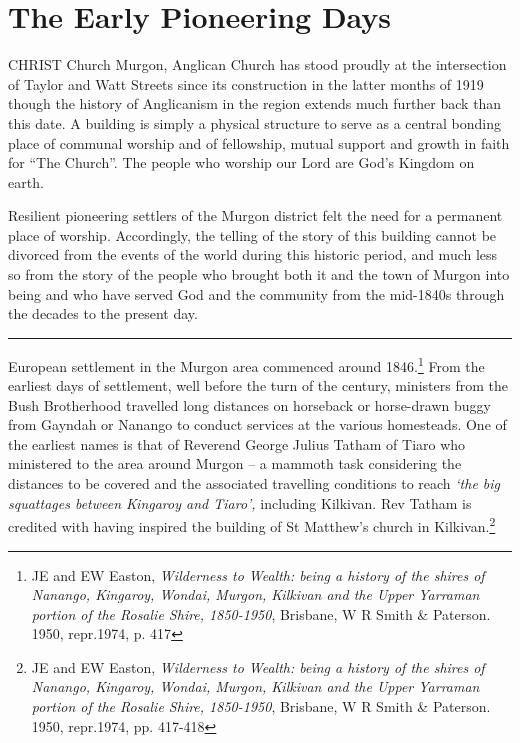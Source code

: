 

\chapter{The Early Pioneering Days}
\nobalance


\lettrine[lines=3]{C}{HRIST}
 Church Murgon, Anglican Church has stood proudly at the intersection of Taylor and Watt Streets since its construction in the latter months of 1919 though the history of Anglicanism in the region extends much further back than this date. A building is simply a physical structure to serve as a central bonding place of communal worship and of fellowship, mutual support and growth in faith for ``The Church''. The people who worship our Lord are God's Kingdom on earth.

Resilient pioneering settlers of the Murgon district felt the need for a permanent place of worship. Accordingly, the telling of the story of this building cannot be divorced from the events of the world during this historic period, and much less so from the story of the people who brought both it and the town of Murgon into being and who have served God and the community from the mid-1840s through the decades to the present day.



\noindent\rule[0.5ex]{\linewidth}{1pt}


\smallskip












\smallskip


European settlement in the Murgon area commenced around 1846.\footnote{JE and EW Easton, \emph{Wilderness to Wealth: being a history of the shires of Nanango, Kingaroy, Wondai, Murgon, Kilkivan and the Upper Yarraman portion of the Rosalie Shire, 1850-1950}, Brisbane, W R Smith \& Paterson. 1950, repr.1974, p. 417} From the earliest days of settlement, well before the turn of the century, ministers from the Bush Brotherhood travelled long distances on horseback or horse-drawn buggy from Gayndah or Nanango to conduct services at the various homesteads. One of the earliest names is that of Reverend George Julius Tatham of Tiaro who ministered to the area around Murgon -- a mammoth task considering the distances to be covered and the associated travelling conditions to reach \emph{`the big squattages between Kingaroy and Tiaro',} including Kilkivan. Rev Tatham is credited with having inspired the building of St Matthew's church in Kilkivan.\footnote{JE and EW Easton, \emph{Wilderness to Wealth: being a history of the shires of Nanango, Kingaroy, Wondai, Murgon, Kilkivan and the Upper Yarraman portion of the Rosalie Shire, 1850-1950}, Brisbane, W R Smith \& Paterson. 1950, repr.1974, pp. 417-418}


